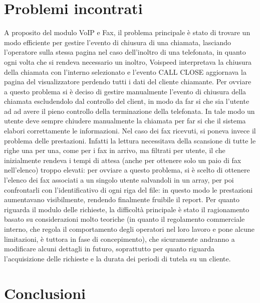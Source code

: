 \chapter{Problemi incontrati}
A proposito del modulo VoIP e Fax, il problema principale \`e stato di trovare un modo efficiente per gestire l'evento di chiusura di una chiamata, lasciando l'operatore sulla stessa pagina nel caso dell'inoltro di una telefonata, in quanto ogni volta che si rendeva necessario un inoltro, Voispeed interpretava la chiusura della chiamata con l'interno selezionato e  l'evento CALL CLOSE aggiornava la pagina del visualizzatore perdendo tutti i dati del cliente chiamante. Per ovviare a questo problema si \`e deciso di gestire manualmente l'evento di chiusura della chiamata escludendolo dal controllo del client, in modo da far si che sia l'utente ad ad avere il pieno controllo della terminazione della telefonata. In tale modo un utente deve sempre chiudere manualmente la chiamata per far si che il sistema elabori correttamente le informazioni.
Nel caso dei fax ricevuti, si poneva invece il problema delle prestazioni. Infatti la lettura necessitava della scansione di tutte le righe una per una, come per i fax in arrivo, ma filtrati per utente, il che inizialmente rendeva i tempi di attesa (anche per ottenere solo un paio di fax nell'elenco) troppo elevati: per ovviare a questo problema, si \`e scelto di ottenere l'elenco dei fax associati a un singolo utente salvandoli in un array, per poi confrontarli con l'identificativo di ogni riga del file: in questo modo le prestazioni aumentavano visibilmente, rendendo finalmente fruibile il report.
Per quanto riguarda il modulo delle richieste, la difficolt\`a principale \`e stato il ragionamento basato su considerazioni molto teoriche (in quanto il regolamento commerciale interno, che regola il comportamento degli operatori nel loro lavoro e pone alcune limitazioni, \`e tuttora in fase di concepimento), che sicuramente andranno a modificare alcuni dettagli in futuro, soprattutto per quanto riguarda l'acquisizione delle richieste e la durata dei periodi di tutela su un cliente.

\chapter{Conclusioni}
